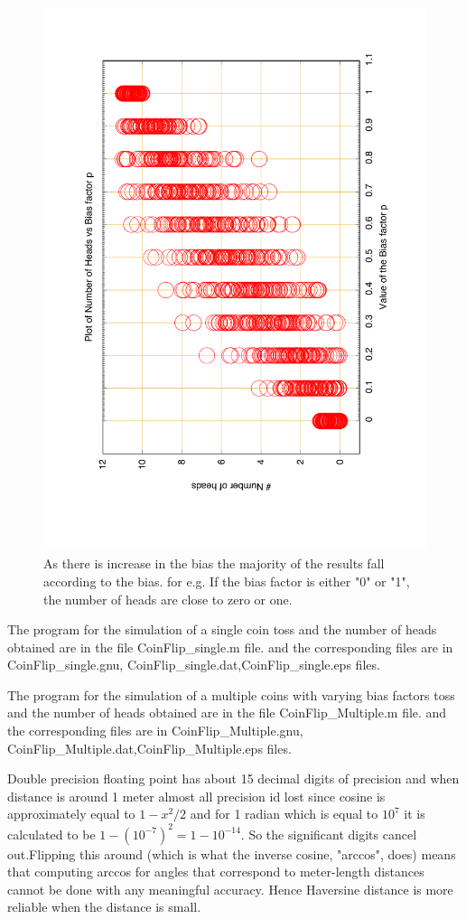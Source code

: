 \documentclass[fleqn,letterpaper,12pt]{report}
\begin{document}
\begin{figure}[ht!]
	\centering
	\includegraphics[height=160mm,width=120mm,angle=-90]{CoinFlip_Multiple.pdf}\caption{As there is increase in the bias the majority of the results fall according to the bias. for e.g. If the bias factor is either "0" or "1", the number of heads are close to zero or one. 
 \label{overflow}}
\end{figure} 
The program for the simulation of a single coin toss and the number of heads obtained are in the file {\color{blue} CoinFlip\_single.m} file. and the corresponding files are in {\color{blue} CoinFlip\_single.gnu, CoinFlip\_single.dat,CoinFlip\_single.eps} files.

The program for the simulation of a multiple coins with varying bias factors toss and the number of heads obtained are in the file {\color{blue} CoinFlip\_Multiple.m} file. and the corresponding files are in {\color{blue} CoinFlip\_Multiple.gnu, CoinFlip\_Multiple.dat,CoinFlip\_Multiple.eps} files.
\vfill
%
\newpage
\clearpage
{}
{}
\problem
Double precision floating point has about 15 decimal digits of precision and when distance is around 1 meter almost all precision id lost since cosine is approximately equal to $1-x^2/2$ and for 1 radian which is equal to $10^7$ it is calculated to be $1-(10^{-7})^2 = 1-10^{-14}$. So the significant digits cancel out.Flipping this around (which is what the inverse cosine, "arccos", does) means that computing arccos for angles that correspond to meter-length distances cannot be done with any meaningful accuracy. Hence Haversine distance is more reliable when the distance is small. \cite{Dist}
\end{document}
